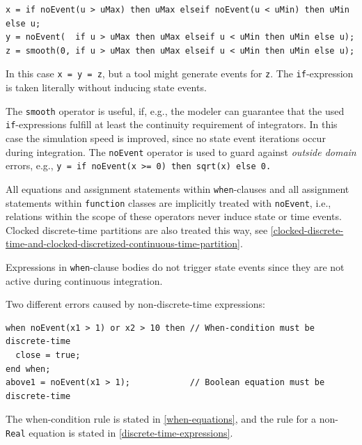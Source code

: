 \begin{example}
\begin{lstlisting}[language=modelica]
x = if noEvent(u > uMax) then uMax elseif noEvent(u < uMin) then uMin else u;
y = noEvent(  if u > uMax then uMax elseif u < uMin then uMin else u);
z = smooth(0, if u > uMax then uMax elseif u < uMin then uMin else u);
\end{lstlisting}

In this case \lstinline!x = y = z!, but a tool might generate events for \lstinline!z!.
The \lstinline!if!-expression is taken literally without inducing state events.

The \lstinline!smooth! operator is useful, if, e.g., the modeler can guarantee that the used \lstinline!if!-expressions fulfill at least the continuity requirement of integrators.
In this case the simulation speed is improved, since no state event iterations occur during integration.
The \lstinline!noEvent! operator is used to guard against \emph{outside domain} errors, e.g., \lstinline!y = if noEvent(x >= 0) then sqrt(x) else 0.!
\end{example}

All equations and assignment statements within \lstinline!when!-clauses and all assignment statements within \lstinline!function! classes are implicitly treated with \lstinline!noEvent!, i.e., relations within the scope of these operators never induce state or time events.
Clocked discrete-time partitions are also treated this way, see \cref{clocked-discrete-time-and-clocked-discretized-continuous-time-partition}.

\begin{nonnormative}
Expressions in \lstinline!when!-clause bodies do not trigger state events since they are not active during continuous integration.
\end{nonnormative}

\begin{example}
Two different errors caused by non-discrete-time expressions:
\begin{lstlisting}[language=modelica]
when noEvent(x1 > 1) or x2 > 10 then // When-condition must be discrete-time
  close = true;
end when;
above1 = noEvent(x1 > 1);            // Boolean equation must be discrete-time
\end{lstlisting}
The when-condition rule is stated in \cref{when-equations}, and the rule for a non-\lstinline!Real! equation is stated in \cref{discrete-time-expressions}.
\end{example}

